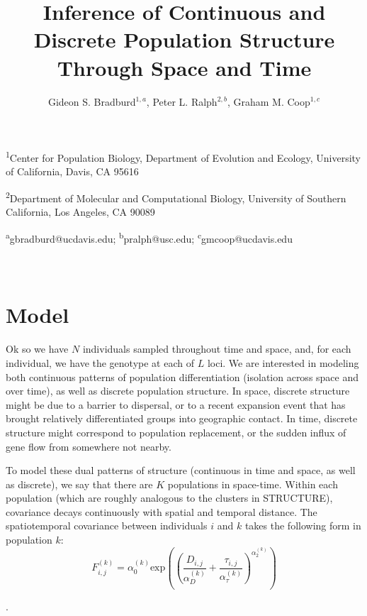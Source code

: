 \documentclass[12pt]{article}
\title{Inference of Continuous and Discrete Population Structure Through Space and Time}
\date{\vspace{-5ex}}
\author{Gideon S. Bradburd$^{1,a}$, Peter L. Ralph$^{2,b}$, Graham M. Coop$^{1,c}$}
\newcommand{\gb}[1]{{\color{blue}{(#1)}}}
\begin{document}
\maketitle

\textsuperscript{1}Center for Population Biology, Department of Evolution and Ecology, University of California, Davis, CA 95616

\textsuperscript{2}Department of Molecular and Computational Biology, University of Southern California, Los Angeles, CA 90089

\textsuperscript{a}gbradburd@ucdavis.edu; 
\textsuperscript{b}pralph@usc.edu;
\textsuperscript{c}gmcoop@ucdavis.edu\\\\\

\newpage

\section{Model}
Ok so we have $N$ individuals sampled throughout time and space, 
and, for each individual, we have the genotype at each of $L$ loci.
We are interested in modeling both continuous patterns of population differentiation 
(isolation across space and over time), as well as discrete population structure.
In space, discrete structure might be due to a barrier to dispersal, 
or to a recent expansion event that has brought relatively differentiated groups into geographic contact.
In time, discrete structure might correspond to population replacement, 
or the sudden influx of gene flow from somewhere not nearby.

To model these dual patterns of structure (continuous in time and space, as well as discrete), 
we say that there are $K$ populations in space-time.  
Within each population (which are roughly analogous to the clusters in STRUCTURE),
covariance decays continuously with spatial and temporal distance. 
The spatiotemporal covariance between individuals $i$ and $k$ takes the following form in population $k$:
\begin{equation}
\label{eq:pop_cov}
F^{(k)}_{i,j} = \alpha^{(k)}_0 \text{exp} \left(	  \left( \frac{D_{i,j}}{\alpha^{(k)}_D} + \frac{\tau_{i,j}}{\alpha^{(k)}_{\tau}} \right) ^{\alpha^{(k)}_2} \right)
\end{equation}

\gb{Peter, this form of covariance is a placeholder.  
I've been looking into different forms from Gneiting 2002, 
but would love some feedback on considerations 
when choosing which properties of which Matern functions are desirable}.
\end{document}
